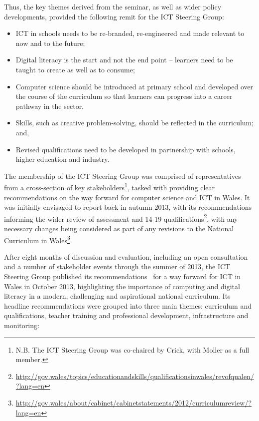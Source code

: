 \documentclass{sig-alternate}
\begin{document}
Thus, the key themes derived from the seminar, as well as wider policy
developments, provided the following remit for the ICT Steering Group:

\begin{itemize}
\item ICT in schools needs to be re-branded, re-engineered and made
relevant to now and to the future;
\item Digital literacy is the start and not the end point -- learners
need to be taught to create as well as to consume;
\item Computer science should be introduced at primary school and
developed over the course of the curriculum so that learners can
progress into a career pathway in the sector.
\item Skills, such as creative problem-solving, should be reflected in
the curriculum; and,
\item Revised qualifications need to be developed in partnership with
schools, higher education and industry.
\end{itemize}

The membership of the ICT Steering Group was comprised of
representatives from a cross-section of key
stakeholders\footnote{N.B. The ICT Steering Group was co-chaired by
Crick, with Moller as a full member.}, tasked with providing clear
recommendations on the way forward for computer science and ICT in
Wales. It was initially envisaged to report back in autumn 2013, with
its recommendations informing the wider review of assessment and 14-19
qualifications\footnote{\url{http://gov.wales/topics/educationandskills/qualificationsinwales/revofqualen/?lang=en}},
with any necessary changes being considered as part of any revisions
to the National Curriculum in
Wales\footnote{\url{http://gov.wales/about/cabinet/cabinetstatements/2012/curriculumreview/?lang=en}}.

After eight months of discussion and evaluation, including an open consultation and a number of
stakeholder events through the summer of 2013, the ICT Steering Group
published its recommendations~\cite{welshictreview:2013} for a way
forward for ICT in Wales in October 2013, highlighting the importance
of computing and digital literacy in a modern, challenging and
aspirational national curriculum. Its headline recommendations were
grouped into three main themes: curriculum and qualifications, teacher
training and professional development, infrastructure and monitoring:
\end{document}
